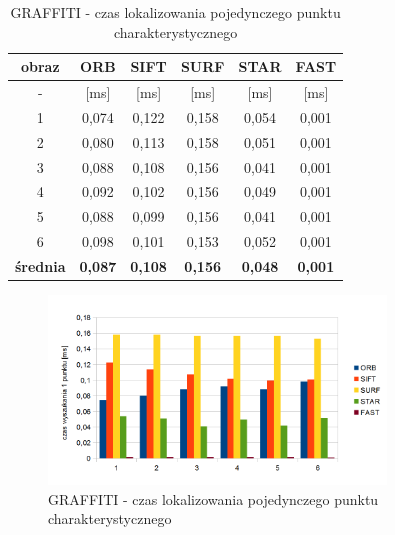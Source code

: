 \begin{table}[htbp]
  \centering
  \caption{GRAFFITI - czas lokalizowania pojedynczego punktu charakterystycznego}
    \begin{tabular}{|c|c|c|c|c|c|}
    \hline
    obraz & \textbf{ORB} & \textbf{SIFT} & \textbf{SURF} & \textbf{STAR} & \textbf{FAST} \\
    \hline
    -  & [ms] & [ms] & [ms] & [ms] & [ms] \\\hline
    1 & 0,074 & 0,122 & 0,158 & 0,054 & 0,001 \\
    2 & 0,080 & 0,113 & 0,158 & 0,051 & 0,001 \\
    3 & 0,088 & 0,108 & 0,156 & 0,041 & 0,001 \\
    4 & 0,092 & 0,102 & 0,156 & 0,049 & 0,001 \\
    5 & 0,088 & 0,099 & 0,156 & 0,041 & 0,001 \\
    6 & 0,098 & 0,101 & 0,153 & 0,052 & 0,001 \\\hline
    \textbf{średnia} & \textbf{0,087} & \textbf{0,108} & \textbf{0,156} & \textbf{0,048} & \textbf{0,001} \\
    \hline
    \end{tabular}%
  \label{tab:graffiti_f2}%
\end{table}%


\begin{figure}
\centering
\includegraphics[width=0.8\textwidth]{pict/mikolajczyk/graff/f2.png}
\caption{GRAFFITI - czas lokalizowania pojedynczego punktu charakterystycznego}
\end{figure}

